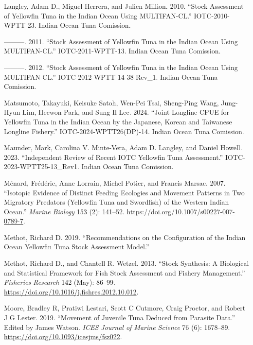 \documentclass[
]{scrartcl}
\newlength{\cslhangindent}
\newenvironment{CSLReferences}[2] %
 {\begin{list}{}{%
  \setlength{\itemindent}{0pt}
  \setlength{\leftmargin}{0pt}
  \setlength{\parsep}{0pt}
  \ifodd #1
   \setlength{\leftmargin}{\cslhangindent}
   \setlength{\itemindent}{-1\cslhangindent}
  \fi
  \setlength{\itemsep}{#2\baselineskip}}}
 {\end{list}}
\begin{document}
\begin{CSLReferences}{1}{0}
Langley, Adam D., Miguel Herrera, and Julien Million. 2010. {``Stock
Assessment of Yellowfin Tuna in the {Indian Ocean} Using
{MULTIFAN-CL}.''} IOTC-2010-WPTT-23. Indian Ocean Tuna Comission.

---------. 2011. {``Stock Assessment of Yellowfin Tuna in the {Indian
Ocean} Using {MULTIFAN-CL}.''} IOTC-2011-WPTT-13. Indian Ocean Tuna
Comission.

---------. 2012. {``Stock Assessment of Yellowfin Tuna in the {Indian
Ocean} Using {MULTIFAN-CL}.''} IOTC-2012-WPTT-14-38 Rev\_1. Indian Ocean
Tuna Comission.

Matsumoto, Takayuki, Keisuke Satoh, Wen-Pei Tsai, Sheng-Ping Wang,
Jung-Hyun Lim, Heewon Park, and Sung Il Lee. 2024. {``Joint Longline
{CPUE} for Yellowfin Tuna in the {Indian Ocean} by the {Japanese},
{Korean} and {Taiwanese} Longline Fishery.''} IOTC-2024-WPTT26(DP)-14.
Indian Ocean Tuna Comission.

Maunder, Mark, Carolina V. Minte-Vera, Adam D. Langley, and Daniel
Howell. 2023. {``Independent Review of Recent {IOTC} Yellowfin Tuna
Assessment.''} IOTC-2023-WPTT25-13\_Rev1. Indian Ocean Tuna Comission.

Ménard, Frédéric, Anne Lorrain, Michel Potier, and Francis Marsac. 2007.
{``Isotopic Evidence of Distinct Feeding Ecologies and Movement Patterns
in Two Migratory Predators (Yellowfin Tuna and Swordfish) of the Western
{Indian Ocean}.''} \emph{Marine Biology} 153 (2): 141--52.
\url{https://doi.org/10.1007/s00227-007-0789-7}.

Methot, Richard D. 2019. {``Recommendations on the Configuration of the
{Indian Ocean} Yellowfin Tuna Stock Assessment Model.''}

Methot, Richard D., and Chantell R. Wetzel. 2013. {``Stock Synthesis:
{A} Biological and Statistical Framework for Fish Stock Assessment and
Fishery Management.''} \emph{Fisheries Research} 142 (May): 86--99.
\url{https://doi.org/10.1016/j.fishres.2012.10.012}.

Moore, Bradley R, Pratiwi Lestari, Scott C Cutmore, Craig Proctor, and
Robert J G Lester. 2019. {``Movement of Juvenile Tuna Deduced from
Parasite Data.''} Edited by James Watson. \emph{ICES Journal of Marine
Science} 76 (6): 1678--89. \url{https://doi.org/10.1093/icesjms/fsz022}.


\end{CSLReferences}
\end{document}
